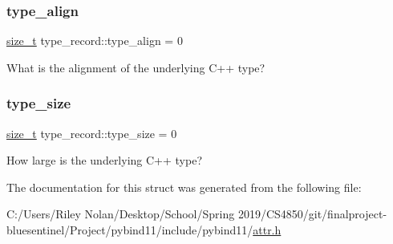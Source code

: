 \mbox{\label{structtype__record_acfe9a04defba752df8501040167c4382}} 
\subsubsection{\texorpdfstring{type\_align}{type\_align}}
{\footnotesize\ttfamily \mbox{\hyperlink{detail_2common_8h_a801d6a451a01953ef8cbae6feb6a3638}{size\+\_\+t}} type\+\_\+record\+::type\+\_\+align = 0}



What is the alignment of the underlying C++ type? 

\mbox{\label{structtype__record_aa49cb21026b070945a61a29f081a2442}} 
\subsubsection{\texorpdfstring{type\_size}{type\_size}}
{\footnotesize\ttfamily \mbox{\hyperlink{detail_2common_8h_a801d6a451a01953ef8cbae6feb6a3638}{size\+\_\+t}} type\+\_\+record\+::type\+\_\+size = 0}



How large is the underlying C++ type? 



The documentation for this struct was generated from the following file\+:\begin{DoxyCompactItemize}
\item 
C\+:/\+Users/\+Riley Nolan/\+Desktop/\+School/\+Spring 2019/\+C\+S4850/git/finalproject-\/bluesentinel/\+Project/pybind11/include/pybind11/\mbox{\hyperlink{attr_8h}{attr.\+h}}\end{DoxyCompactItemize}
